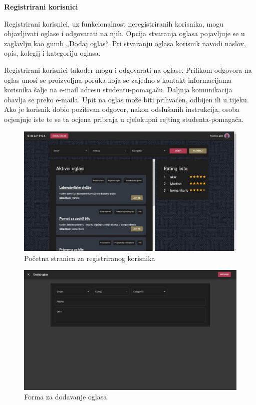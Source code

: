 	\noindent \textbf{Registrirani korisnici}
	
			Registrirani korisnici, uz funkcionalnost neregistriranih korisnika, mogu objavljivati oglase i odgovarati na njih. Opcija stvaranja oglasa pojavljuje se u zaglavlju kao gumb „Dodaj oglas“. Pri stvaranju oglasa korisnik navodi naslov, opis, kolegij i kategoriju oglasa.
			
			Registrirani korisnici također mogu i odgovarati na oglase. Prilikom odgovora na oglas unosi se proizvoljna poruka koja se zajedno s kontakt informacijama korisnika šalje na e-mail adresu studentu-pomagaču. Daljnja komunikacija obavlja se preko e-maila. Upit na oglas može biti prihvaćen, odbijen ili u tijeku. Ako je korisnik dobio pozitivan odgovor, nakon odslušanih instrukcija, osoba ocjenjuje iste  te se ta ocjena pribraja u cjelokupni rejting studenta-pomagača. 
			
			\begin{figure}[H]
				\includegraphics[scale=0.37]{slike/registrirani.jpg} 
				\centering
				\caption{Početna stranica za registriranog korisnika}
				\label{fig:registrirani}
			\end{figure}
		
			\begin{figure}[H]
				\includegraphics[scale=0.37]{slike/dodajOglas.jpg} 
				\centering
				\caption{Forma za dodavanje oglasa}
				\label{fig:oglas}
			\end{figure}
		
